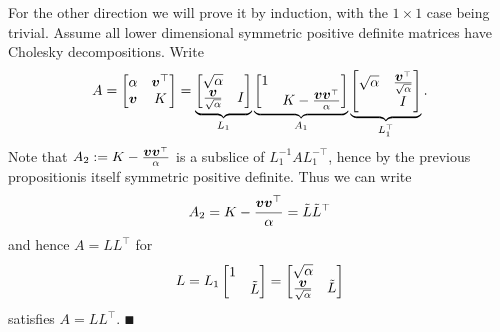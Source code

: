 For the other direction we will prove it by induction, with the $1 \ensuremath{\times} 1$ case being trivial.  Assume all lower dimensional symmetric positive definite matrices have Cholesky decompositions. Write
\[
A = \begin{bmatrix} \alpha & \bm{{\mbox{\boldmath$v$\unboldmath}}}^\top \\
                    \bm{{\mbox{\boldmath$v$\unboldmath}}}   & K
                    \end{bmatrix} = \underbrace{\begin{bmatrix} \sqrt{\alpha} \\ 
                                    {\bm{{\mbox{\boldmath$v$\unboldmath}}} \over \sqrt{\alpha}} & I \end{bmatrix}}_{L_1}
                                    \underbrace{\begin{bmatrix} 1  \\ & K - {\bm{{\mbox{\boldmath$v$\unboldmath}}} \bm{{\mbox{\boldmath$v$\unboldmath}}}^\top \over \alpha} \end{bmatrix}}_{A_1}
                                    \underbrace{\begin{bmatrix} \sqrt{\alpha} & {\bm{{\mbox{\boldmath$v$\unboldmath}}}^\top \over \sqrt{\alpha}} \\
                                     & I \end{bmatrix}}_{L_1^\top}.
\]
Note that $A_2 := K - {\bm{{\mbox{\boldmath$v$\unboldmath}}} \bm{{\mbox{\boldmath$v$\unboldmath}}}^\top \over \alpha}$ is a subslice of $L_1^{-1} A L_1^{-\ensuremath{\top}}$, hence by the previous propositionis itself symmetric positive definite. Thus we can write 
\[
A_2 = K - {\bm{{\mbox{\boldmath$v$\unboldmath}}} \bm{{\mbox{\boldmath$v$\unboldmath}}}^\top \over \alpha} = {\tilde L} {\tilde L}^\top
\]
and hence $A = L L^\ensuremath{\top}$ for
\[
L= L_1 \begin{bmatrix}1 \\ & {\tilde L} \end{bmatrix} = \begin{bmatrix} \sqrt{\alpha} \\ {\bm{{\mbox{\boldmath$v$\unboldmath}}} \over \sqrt{\alpha}} & {\tilde L} \end{bmatrix}
\]
satisfies $A = L L^\ensuremath{\top}$. \ensuremath{\QED}

